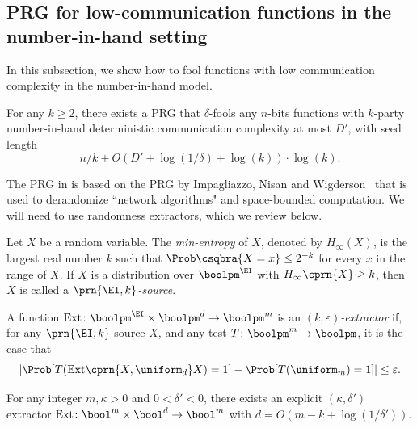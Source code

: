     \subsection{PRG for low-communication functions in the number-in-hand setting}\label{appendix:prg_cc}
	
	In this subsection, we show how to fool functions with low communication complexity in the number-in-hand model.
    
	\begin{theorem}\label{lem:prg-lc-app}
		For any $k\geq 2$, there exists a PRG that $\delta$-fools any $n$-bits functions with $k$-party number-in-hand deterministic communication complexity at most $D'$, with seed length
		\[
			n/k+O\left(D' + \log(1/\delta)+\log(k)\right)\cdot\log(k).
		\]
	\end{theorem}
	
	The PRG in  is based on the PRG by Impagliazzo, Nisan and Wigderson~\cite{INW94} that is used to derandomize ``network algorithms" and space-bounded computation. We will need to use randomness extractors, which we review below.
	
	\begin{definition}
    	Let $X$ be a random variable. The \emph{min-entropy} of $X$, denoted by $H_\infty(X)$, is the largest real number $k$ such that $\Prob\csqbra{X=x}\leq2^{-k}$ for every $x$ in the range of $X$. If $X$ is a distribution over $\boolpm^\EI$ with $H_\infty\cprn{X}\geq k$, then $X$ is called a {\em$\prn{\EI,k}$-source}.
    \end{definition}
    
    \begin{definition}[Extractors]
    	A function $\mathrm{Ext}\colon\boolpm^\EI\times\boolpm^d\to\boolpm^m$ is an \emph{$(k,\varepsilon)$-extractor} if, for any $\prn{\EI,k}$-source $X$, and any test $T\colon\boolpm^m\to\boolpm$, it is the case that
    	\[
    	    \left|\Prob[T(\mathrm{Ext}\cprn{X,\uniform_d}X)=1]-\Prob[T(\uniform_m)=1]\right|\leq \varepsilon.
    	\]
    \end{definition}
	
    \begin{theorem}\label{thm:prg-ext}
		For any integer $m,\kappa>0$ and $0<\delta'<0$, there exists an explicit $(\kappa,\delta')$ extractor $\mathrm{Ext}\colon\bool^{m}\times\bool^d\to\bool^{m}$ with $d=O(m-k+\log(1/\delta'))$.
	\end{theorem}

